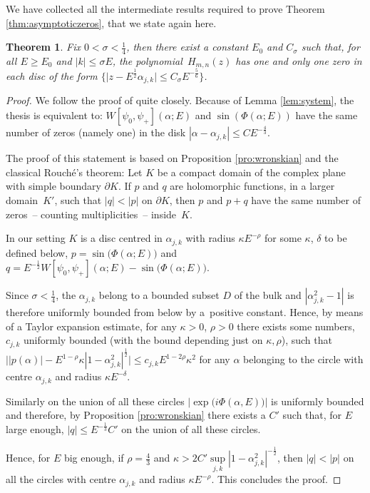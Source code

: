 \documentclass[pdftex]{sigma}
\numberwithin{equation}{section}
\newtheorem*{thm*}{Theorem}
\newcommand{\al}{\alpha}
\begin{document}
We have collected all the intermediate results required to prove Theorem \ref{thm:asymptoticzeros}, that we state again here.
\begin{thm*}
Fix $0<\sigma<\frac14$, then there exist a constant $E_0$ and $C_{\sigma}$ such that, for all $E\geq E_0$ and $|k|\leq \sigma E$, the polynomial~$H_{m,n}(z)$ has one and only one zero in each disc of the form $\big\{\big|z-E^{\frac12}\al_{j,k}\big|\leq C_{\sigma} E^{-\frac56}\big\}$.
\end{thm*}
\begin{proof} We follow the proof of \cite[Theorem 1]{piwkb2} quite closely. Because of Lemma \ref{lem:system}, the thesis is equivalent to: $W[\psi_0,\psi_+](\al;E)$ and $\sin(\Phi(\al;E))$ have the same number of zeros (namely one) in the disk $|\al-\al_{j,k}|\leq C E^{-\frac43}$.
	
The proof of this statement is based on Proposition \ref{pro:wronskian} and the classical Rouch\'e's theorem: Let $K$ be a compact domain of the complex plane with simple boundary $\partial K$. If $p$ and $q$ are holomorphic functions, in a larger domain~$K'$, such that $|q| <|p|$ on $\partial K$, then $p$ and $p+q$ have the same number of zeros~-- counting multiplicities~-- inside~$K$.
	
In our setting $K$ is a disc centred in $\al_{j,k}$ with radius $\kappa E^{-\rho}$ for some $\kappa$, $\delta$ to be def\/ined below, $p=\sin \big(\Phi(\al;E)\big) $ and $q=E^{-\frac12} W[\psi_0,\psi_+](\al;E)-\sin\big(\Phi(\al;E)\big)$.
	
Since $\sigma<\frac14$, the $\al_{j,k}$ belong to a bounded subset $D$ of the bulk and	$|\al_{j,k}^2-1|$ is therefore uniformly bounded from below by a~positive constant.	Hence, by means of a Taylor expansion estimate, for any $\kappa>0$, $\rho>0$ there exists some numbers, $c_{j,k}$ uniformly bounded (with the bound depending just on $\kappa,\rho$), such that $||p(\al)\big|{-}E^{1-\rho}\kappa |1-\al_{j,k}^2|^{\frac12}\big|\leq c_{j,k}E^{1-2\rho}\kappa^2$ for any $\al$ belonging to the circle
	with centre $\al_{j,k}$ and radius $\kappa E^{-\delta}$.
	
	Similarly on the union of all these circles $|\exp{\big( i\Phi(\al,E)\big)}|$ is uniformly bounded and therefore,
	by Proposition \ref{pro:wronskian} there exists a $C'$ such that, for $E$ large enough,
	$|q| \leq E^{-\frac13} C'$ on the union of all these circles.
	
	Hence, for $E$ big enough, if $\rho=\frac43$ and $\kappa >2 C' \sup\limits_{j,k}|1-\al_{j,k}^2|^{-\frac12}$, then
	$|q|<|p|$ on all the circles with centre $\al_{j,k}$ and radius $\kappa E^{-\rho}$. This concludes the proof.
\end{proof}
\end{document}
